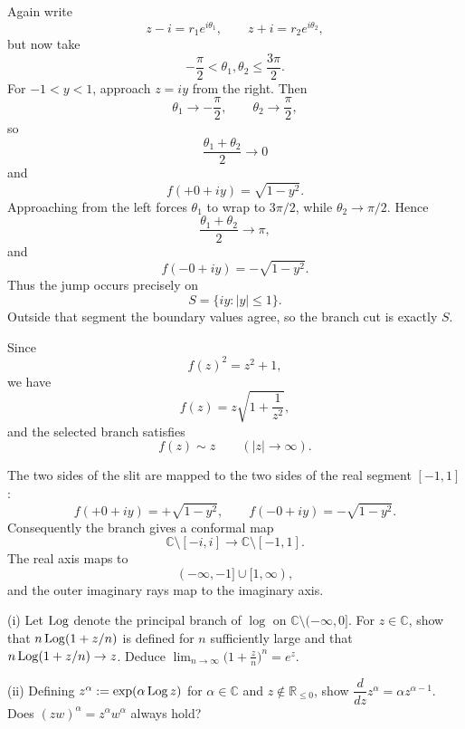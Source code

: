 \begin{solution}
Again write
\[
z-i=r_1e^{i\theta_1},
\qquad
z+i=r_2e^{i\theta_2},
\]
but now take
\[
-\frac{\pi}{2}<\theta_1,\theta_2\le\frac{3\pi}{2}.
\]
For \(-1<y<1\), approach \(z=iy\) from the right. Then
\[
\theta_1\to-\frac{\pi}{2},
\qquad
\theta_2\to\frac{\pi}{2},
\]
so
\[
\frac{\theta_1+\theta_2}{2}\to0
\]
and
\[
f(+0+iy)=\sqrt{1-y^2}.
\]
Approaching from the left forces \(\theta_1\) to wrap to \(3\pi/2\), while \(\theta_2\to\pi/2\). Hence
\[
\frac{\theta_1+\theta_2}{2}\to\pi,
\]
and
\[
f(-0+iy)=-\sqrt{1-y^2}.
\]
Thus the jump occurs precisely on
\[
S=\{iy:|y|\le1\}.
\]
Outside that segment the boundary values agree, so the branch cut is exactly \(S\).

Since
\[
f(z)^2=z^2+1,
\]
we have
\[
f(z)
=
z\sqrt{1+\frac1{z^2}},
\]
and the selected branch satisfies
\[
f(z)\sim z
\qquad(|z|\to\infty).
\]

The two sides of the slit are mapped to the two sides of the real segment \([-1,1]\):
\[
f(+0+iy)=+\sqrt{1-y^2},
\qquad
f(-0+iy)=-\sqrt{1-y^2}.
\]
Consequently the branch gives a conformal map
\[
\boxed{
\mathbb C\setminus[-i,i]
\longrightarrow
\mathbb C\setminus[-1,1].
}
\]
The real axis maps to
\[
(-\infty,-1]\cup[1,\infty),
\]
and the outer imaginary rays map to the imaginary axis.
\end{solution}


\begin{problem}[CP-IV-0027]
\label{prob:cp-iv-0027}
(i) Let $\operatorname{Log}$ denote the principal branch of $\log$ on $\mathbb C\setminus(-\infty,0]$.
For $z\in\mathbb C$, show that $n\operatorname{Log}(1+z/n)$ is defined for $n$ sufficiently large and that
$n\operatorname{Log}(1+z/n)\to z$. Deduce $\displaystyle\lim_{n\to\infty}\bigl(1+\frac{z}{n}\bigr)^n=e^{z}$.
\smallskip

(ii) Defining $z^\alpha:=\exp(\alpha\operatorname{Log} z)$ for $\alpha\in\mathbb C$ and $z\notin\mathbb R_{\le 0}$,
show $\dfrac{d}{dz}z^\alpha=\alpha z^{\alpha-1}$. Does $(zw)^\alpha=z^\alpha w^\alpha$ always hold?
\end{problem}

